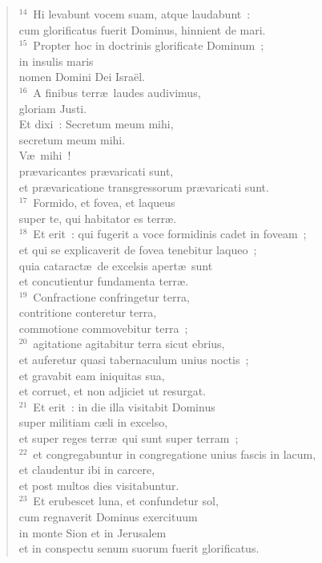 \begin{flushleft}\begin{verse}${}^{14}$~Hi levabunt vocem suam, atque laudabunt~:\\ cum glorificatus fuerit Dominus, hinnient de mari.\\
${}^{15}$~Propter hoc in doctrinis glorificate Dominum~;\\ in insulis maris\\ nomen Domini Dei Isra\"el.\\
${}^{16}$~A finibus terr\ae\ laudes audivimus,\\ gloriam Justi.\\ Et dixi~: Secretum meum mihi,\\ secretum meum mihi.\\ V\ae\ mihi~!\\ pr\ae varicantes pr\ae varicati sunt,\\ et pr\ae varicatione transgressorum pr\ae varicati sunt.\\
${}^{17}$~Formido, et fovea, et laqueus\\ super te, qui habitator es terr\ae .\\
${}^{18}$~Et erit~: qui fugerit a voce formidinis cadet in foveam~;\\ et qui se explicaverit de fovea tenebitur laqueo~;\\ quia cataract\ae\ de excelsis apert\ae\ sunt\\ et concutientur fundamenta terr\ae .\\
${}^{19}$~Confractione confringetur terra,\\ contritione conteretur terra,\\ commotione commovebitur terra~;\\
${}^{20}$~agitatione agitabitur terra sicut ebrius,\\ et auferetur quasi tabernaculum unius noctis~;\\ et gravabit eam iniquitas sua,\\ et corruet, et non adjiciet ut resurgat.\\
${}^{21}$~Et erit~: in die illa visitabit Dominus\\ super militiam c\ae li in excelso,\\ et super reges terr\ae\ qui sunt super terram~;\\
${}^{22}$~et congregabuntur in congregatione unius fascis in lacum,\\ et claudentur ibi in carcere,\\ et post multos dies visitabuntur.\\
${}^{23}$~Et erubescet luna, et confundetur sol,\\ cum regnaverit Dominus exercituum\\ in monte Sion et in Jerusalem\\ et in conspectu senum suorum fuerit glorificatus.\end{verse}\end{flushleft}



